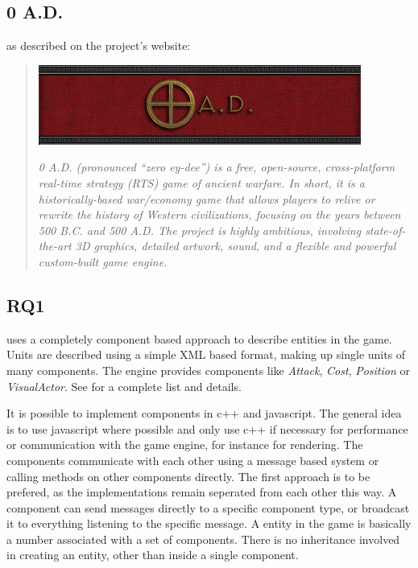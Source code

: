 \subsection{0 A.D.}

\AD{} as described on the project's website:
\begin{quote}
\begin{center}\includegraphics[scale=0.8]{pics/0ad}\end{center}


\textit{0 A.D. (pronounced “zero ey-dee”) is a free, open-source, cross-platform real-time strategy (RTS) game of
ancient warfare. In short, it is a historically-based war/economy game that allows players to relive or rewrite the
history of Western civilizations, focusing on the years between 500 B.C. and 500 A.D. The project is highly ambitious,
involving state-of-the-art 3D graphics, detailed artwork, sound, and a flexible and powerful custom-built game engine.}
\end{quote}

\subsection{RQ1}
\AD{} uses a completely component based approach to describe entities in the game. Units are described using a simple
XML based format, making up single units of many components. The engine provides components like \textit{Attack},
\textit{Cost}, \textit{Position} or \textit{VisualActor}. See \citet[Entity Component Documenation]{0adcomponents} for a
complete list and details. 

It is possible to implement components in c++ and javascript. The general idea is to use
javascript where possible and only use c++ if necessary for performance or communication with the game engine, for
instance for rendering. The components communicate with each other using a message based system or calling methods on
other components directly. The first approach is to be prefered, as the implementations remain seperated from each other
this way. A component can send messages directly to a specific component type, or broadcast it to everything listening to
the specific message. A entity in the game is basically a number associated with a set of components. There is no
inheritance involved in creating an entity, other than inside a single component.

